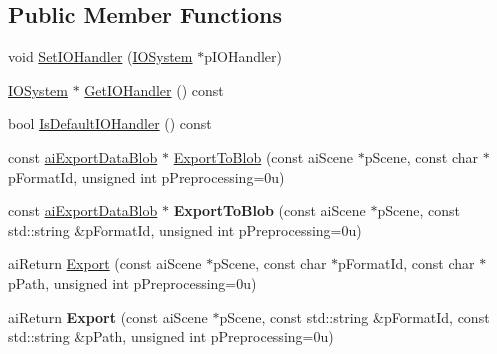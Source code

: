 \subsection*{Public Member Functions}
\begin{DoxyCompactItemize}
\item 
void \hyperlink{class_assimp_1_1_exporter_a054201cf78fa352b1281ea8b484f6e3a}{Set\-I\-O\-Handler} (\hyperlink{class_assimp_1_1_i_o_system}{I\-O\-System} $\ast$p\-I\-O\-Handler)
\item 
\hyperlink{class_assimp_1_1_i_o_system}{I\-O\-System} $\ast$ \hyperlink{class_assimp_1_1_exporter_a736d66db1a94de7df6eb978975e8d47a}{Get\-I\-O\-Handler} () const 
\item 
bool \hyperlink{class_assimp_1_1_exporter_a9ae1196f04cceb0d35fde6229ba41d0b}{Is\-Default\-I\-O\-Handler} () const 
\item 
const \hyperlink{structai_export_data_blob}{ai\-Export\-Data\-Blob} $\ast$ \hyperlink{class_assimp_1_1_exporter_a390c0950a3a164fc431e0797ae1a84d1}{Export\-To\-Blob} (const ai\-Scene $\ast$p\-Scene, const char $\ast$p\-Format\-Id, unsigned int p\-Preprocessing=0u)
\item 
\hypertarget{class_assimp_1_1_exporter_a02aa8c453879dc9365e7ec4d1e8d7413}{const \hyperlink{structai_export_data_blob}{ai\-Export\-Data\-Blob} $\ast$ {\bfseries Export\-To\-Blob} (const ai\-Scene $\ast$p\-Scene, const std\-::string \&p\-Format\-Id, unsigned int p\-Preprocessing=0u)}\label{class_assimp_1_1_exporter_a02aa8c453879dc9365e7ec4d1e8d7413}

\item 
ai\-Return \hyperlink{class_assimp_1_1_exporter_ab8edf249172567a78ca302278a415e35}{Export} (const ai\-Scene $\ast$p\-Scene, const char $\ast$p\-Format\-Id, const char $\ast$p\-Path, unsigned int p\-Preprocessing=0u)
\item 
\hypertarget{class_assimp_1_1_exporter_aec681d38ca0bef85a015c64831a3566a}{ai\-Return {\bfseries Export} (const ai\-Scene $\ast$p\-Scene, const std\-::string \&p\-Format\-Id, const std\-::string \&p\-Path, unsigned int p\-Preprocessing=0u)}\label{class_assimp_1_1_exporter_aec681d38ca0bef85a015c64831a3566a}


\end{DoxyCompactItemize}
